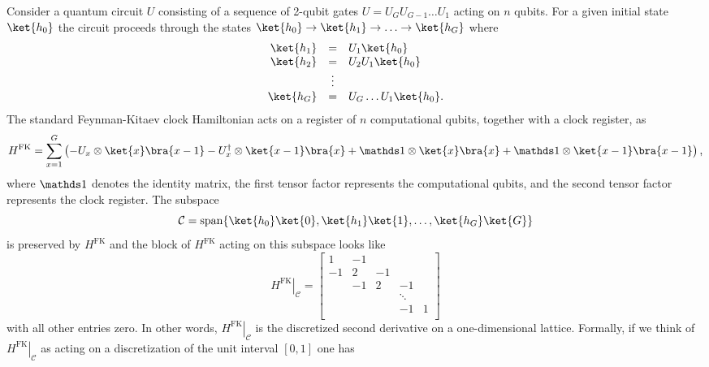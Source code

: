 \documentclass[11pt]{article}
\begin{document}
Consider a quantum circuit $U$ consisting of a sequence of 2-qubit gates $U = U_G U_{G-1} \ldots U_1$ acting on $n$ qubits. For a given initial state $\ket{h_0}$ the circuit proceeds through the states $\ket{h_0} \to \ket{h_1} \to \ldots \to \ket{h_G}$ where
\begin{equation}
\begin{array}{rcl}
\ket{h_1} & = & U_1 \ket{h_0} \\
\ket{h_2} & = & U_2 U_1 \ket{h_0} \\
             & \vdots & \\
\ket{h_G} & = & U_G \ldots U_1 \ket{h_0}.
\end{array}
\label{history}
\end{equation}
The standard Feynman-Kitaev clock Hamiltonian \cite{F85, KSV02} acts on a register of $n$ computational qubits, together with a clock register, as
\begin{equation}
\label{hfk}
H^{\mathrm{FK}} = \sum_{x = 1}^G \left(-U_x \otimes \ket{x}\bra{x-1} - U_x^\dag \otimes \ket{x-1}\bra{x} + \id \otimes \ket{x}\bra{x} + \id \otimes \ket{x-1} \bra{x-1} \right),
\end{equation}
where $\id$ denotes the identity matrix, the first tensor factor represents the computational qubits, and the second tensor factor represents the clock register. The subspace
\begin{equation}
\mathcal{C} = \mathrm{span} \{ \ket{h_0} \ket{0}, \ket{h_1} \ket{1}, \ldots, \ket{h_G} \ket{G} \}
\end{equation}
is preserved by $H^{\mathrm{FK}}$ and the block of $H^{\mathrm{FK}}$ acting on this subspace looks like
\begin{equation}
\left. H^{\mathrm{FK}} \right|_\mathcal{C} = \left[ \begin{array}{rrrrr}
1 & -1 &     &        &   \\
-1& 2  & -1  &        &   \\
  & -1 &  2  & -1     &   \\
  &    &     & \ddots &   \\
  &    &     &    -1  & 1 \\
\end{array} \right]
\end{equation}
with all other entries zero. In other words, $\left. H^{\mathrm{FK}} \right|_{\mathcal{C}}$ is the discretized second derivative on a one-dimensional lattice. Formally, if we think of $\left. H^{\mathrm{FK}} \right|_\mathcal{C}$ as acting on a discretization of the unit interval $[0,1]$ one has
\end{document}
